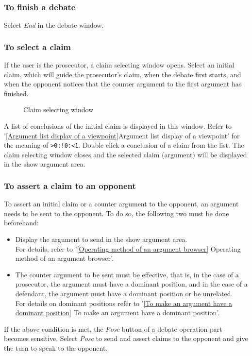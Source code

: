 \subsubsection{To finish a debate} 
Select {\sl End} in the debate window.

\subsubsection{To select a claim}\label{To select a claim} 
If the user is the prosecutor, a claim selecting window opens.
Select an initial claim, which will guide the prosecutor's claim, when the debate first starts, and when the opponent notices that the counter argument to the first argument has finished.

\begin{figure}[htb]
\begin{center}
\end{center}
\caption{Claim selecting window}\label{Claim selecting window}
\end{figure}

A list of conclusions of the initial claim is displayed in this window.
Refer to '\ref{Argument list display of a viewpoint}Argument list display of a viewpoint' for the meaning of \verb+>0:!0:<1+.
Double click a conclusion of a claim from the list.
The claim selecting window closes and the selected claim (argument) will be displayed in the show argument area.

\subsubsection{To assert a claim to an opponent}
To assert an initial claim or a counter argument to the opponent, an argument needs to be sent to the opponent.
To do so, the following two must be done beforehand:
\begin{itemize}
\item Display the argument to send in the show argument area.\\
For details, refer to '\ref{Operating method of an argument browser} Operating method of an argument browser'.
\item The counter argument to be sent must be effective, that is, in the case of a prosecutor, the argument must have a dominant position, and in the case of a defendant, the argument must have a dominant position or be unrelated.\\
For details on dominant positions refer to '\ref{To make an argument have a dominant position} To make an argument have a dominant position'. 
\end{itemize}
If the above condition is met, the {\sl Pose} button of a debate operation part becomes sensitive.
Select {\sl Pose} to send and assert claims to the opponent and give the turn to speak to the opponent.

